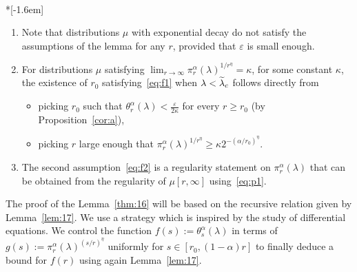 \documentclass[AHL,Unicode,longabstracts]{cedram}
\newcommand{\ep}{\varepsilon}
\let\oldtilde\tilde
\renewcommand*{\tilde}[1]{\mathchoice{\widetilde{#1}}{\widetilde{#1}}{\oldtilde{#1}}{\oldtilde{#1}}}
\begin{document}
\begin{rema}\label{rem:22}\ \\*[-1.6em]
\begin{enumerate}
\item Note that distributions $\mu$ with exponential decay do not satisfy the assumptions of the lemma for any $r$, provided that $\ep$ is small enough. %
\item For distributions $\mu$ satisfying $\lim_{r\rightarrow\infty}\pi_r^\alpha(\lambda)^{1/r^\eta}= \kappa$, for some constant $\kappa$, the existence of $r_0$ satisfying~\eqref{eq:f1} when $\lambda<\tilde\lambda_c$ follows directly from
\begin{itemize}%
\item picking $r_0$ such that $\theta_r^\alpha(\lambda)<\tfrac{\ep}{2\kappa}$ for every $r\ge r_0$ (by Proposition~\ref{cor:a}),
\item picking $r$ large enough that $\pi_r^\alpha(\lambda)^{1/r^\eta}\ge \kappa 2^{-(\alpha/r_0)^\eta}$.
\end{itemize}
\item The second assumption~\eqref{eq:f2} is a regularity statement on $\pi_r^\alpha(\lambda)$ that can be obtained from the regularity of $\mu[r,\infty]$ using~\eqref{eq:p1}.
\end{enumerate}
\end{rema}


The proof of the Lemma~\ref{thm:16} will be based on the recursive relation given by Lemma~\ref{lem:17}. We use a strategy which is inspired by the study of differential equations. We control the function $f(s):=\theta_s^\alpha(\lambda)$ in terms of $g(s):=\pi_r^\alpha(\lambda)^{(s/r)^\eta}$ uniformly for $s\in [r_0, (1-\alpha) r]$ to finally deduce a bound for $f(r)$ using again Lemma~\ref{lem:17}.
\end{document}
